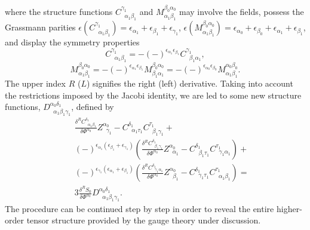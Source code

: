 \documentclass[a4paper,12pt]{article}
\begin{document}
where the structure functions $C_{\;\;\alpha _{1}\beta _{1}}^{\gamma _{1}}$
and $M_{\alpha _{1}\beta _{1}}^{\beta _{0}\alpha _{0}}$ may involve the
fields, possess the Grassmann parities $\epsilon \left( C_{\;\;\alpha
_{1}\beta _{1}}^{\gamma _{1}}\right) =\epsilon _{\alpha _{1}}+\epsilon
_{\beta _{1}}+\epsilon _{\gamma _{1}}$, $\epsilon \left( M_{\alpha _{1}\beta
_{1}}^{\beta _{0}\alpha _{0}}\right) =\epsilon _{\alpha _{0}}+\epsilon
_{\beta _{0}}+\epsilon _{\alpha _{1}}+\epsilon _{\beta _{1}}$, and display
the symmetry properties 
\begin{equation}
C_{\;\;\alpha _{1}\beta _{1}}^{\gamma _{1}}=-\left( -\right) ^{\epsilon
_{\alpha _{1}}\epsilon _{\beta _{1}}}C_{\;\;\beta _{1}\alpha _{1}}^{\gamma
_{1}},  \label{sp3.b}
\end{equation}
\begin{equation}
M_{\alpha _{1}\beta _{1}}^{\beta _{0}\alpha _{0}}=-\left( -\right)
^{\epsilon _{\alpha _{1}}\epsilon _{\beta _{1}}}M_{\beta _{1}\alpha
_{1}}^{\beta _{0}\alpha _{0}}=-\left( -\right) ^{\epsilon _{\alpha
_{0}}\epsilon _{\beta _{0}}}M_{\alpha _{1}\beta _{1}}^{\alpha _{0}\beta
_{0}}.  \label{sp3.c}
\end{equation}
The upper index $R$ ($L$) signifies the right (left) derivative. Taking into
account the restrictions imposed by the Jacobi identity, we are led to some
new structure functions, $D_{\;\;\alpha _{1}\beta _{1}\gamma _{1}}^{\alpha
_{0}\delta _{1}}$, defined by 
\begin{eqnarray}
&&\frac{\delta ^{R}C_{\;\;\alpha _{1}\beta _{1}}^{\delta _{1}}}{\delta \Phi
^{\alpha _{0}}}Z_{\;\;\gamma _{1}}^{\alpha _{0}}-C_{\;\;\alpha _{1}\tau
_{1}}^{\delta _{1}}C_{\;\;\beta _{1}\gamma _{1}}^{\tau _{1}}+  \nonumber \\
&&\left( -\right) ^{\epsilon _{\alpha _{1}}\left( \epsilon _{\beta
_{1}}+\epsilon _{\gamma _{1}}\right) }\left( \frac{\delta ^{R}C_{\;\;\beta
_{1}\gamma _{1}}^{\delta _{1}}}{\delta \Phi ^{\alpha _{0}}}Z_{\;\;\alpha
_{1}}^{\alpha _{0}}-C_{\;\;\beta _{1}\tau _{1}}^{\delta _{1}}C_{\;\;\gamma
_{1}\alpha _{1}}^{\tau _{1}}\right) +  \nonumber \\
&&\left( -\right) ^{\epsilon _{\gamma _{1}}\left( \epsilon _{\alpha
_{1}}+\epsilon _{\beta _{1}}\right) }\left( \frac{\delta ^{R}C_{\;\;\gamma
_{1}\alpha _{1}}^{\delta _{1}}}{\delta \Phi ^{\alpha _{0}}}Z_{\;\;\beta
_{1}}^{\alpha _{0}}-C_{\;\;\gamma _{1}\tau _{1}}^{\delta _{1}}C_{\;\;\alpha
_{1}\beta _{1}}^{\tau _{1}}\right) =  \nonumber \\
&&3\frac{\delta ^{R}S_{0}}{\delta \Phi ^{\alpha _{0}}}D_{\;\;\alpha
_{1}\beta _{1}\gamma _{1}}^{\alpha _{0}\delta _{1}}.  \label{sp3.d}
\end{eqnarray}
The procedure can be continued step by step in order to reveal the entire
higher-order tensor structure provided by the gauge theory under discussion.
\end{document}
